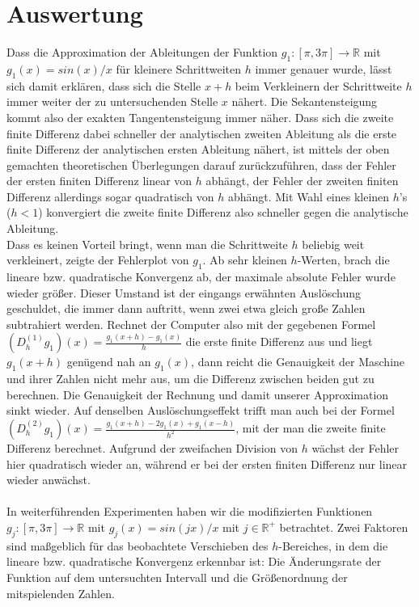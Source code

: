 \documentclass{scrartcl}
\begin{document}
\pagebreak \section{Auswertung}
\label{sec:auswertung}
Dass die Approximation der Ableitungen der Funktion $g_1:[\pi, 3\pi] \rightarrow \mathbb{R}$ mit $g_1(x)=sin(x)/x$ für kleinere Schrittweiten $h$ immer genauer wurde, lässt sich damit erklären, dass sich die Stelle $x+h$ beim Verkleinern der Schrittweite $h$ immer weiter der zu untersuchenden Stelle $x$ nähert.
Die Sekantensteigung kommt also der exakten Tangentensteigung immer näher.
Dass sich die zweite finite Differenz dabei schneller der analytischen zweiten Ableitung als die erste finite Differenz der analytischen ersten Ableitung nähert, ist mittels der oben gemachten theoretischen Überlegungen darauf zurückzuführen, dass der Fehler der ersten finiten Differenz linear von $h$ abhängt, der Fehler der zweiten finiten Differenz allerdings sogar quadratisch von $h$ abhängt.
Mit Wahl eines kleinen $h$'s ($h<1$) konvergiert die zweite finite Differenz also schneller gegen die analytische Ableitung. \\
Dass es keinen Vorteil bringt, wenn man die Schrittweite $h$ beliebig weit verkleinert, zeigte der Fehlerplot von $g_1$. Ab sehr kleinen $h$-Werten, brach die lineare bzw. quadratische Konvergenz ab, der maximale absolute Fehler wurde wieder größer.
Dieser Umstand ist der eingangs erwähnten Auslöschung geschuldet, die immer dann auftritt, wenn zwei etwa gleich große Zahlen subtrahiert werden.
Rechnet der Computer also mit der gegebenen Formel $(D_h^{(1)}g_1)(x) = \frac{g_1(x+h)-g_1(x)}{h}$ die erste finite Differenz aus und liegt $g_1(x+h)$ genügend nah an $g_1(x)$, dann reicht die Genauigkeit der Maschine und ihrer Zahlen nicht mehr aus, um die Differenz zwischen beiden gut zu berechnen. Die Genauigkeit der Rechnung und damit unserer Approximation sinkt wieder.
Auf denselben Auslöschungseffekt trifft man auch bei der Formel $(D_h^{(2)}g_1)(x) = \frac{g_1(x+h)-2g_1(x)+g_1(x-h)}{h^2}$, mit der man die zweite finite Differenz berechnet.
Aufgrund der zweifachen Division von $h$ wächst der Fehler hier quadratisch wieder an, während er bei der ersten finiten Differenz nur linear wieder anwächst. \\
 \\
In weiterführenden Experimenten haben wir die modifizierten Funktionen $g_j:[\pi, 3\pi] \rightarrow \mathbb{R}$ mit $g_j(x) = sin(j x)/x$ mit $j \in \mathbb{R^{+}}$ betrachtet. Zwei Faktoren sind maßgeblich für das beobachtete Verschieben des $h$-Bereiches, in dem die lineare bzw. quadratische Konvergenz erkennbar ist: Die Änderungsrate der Funktion auf dem untersuchten Intervall und die Größenordnung der mitspielenden Zahlen. \\
\end{document}
